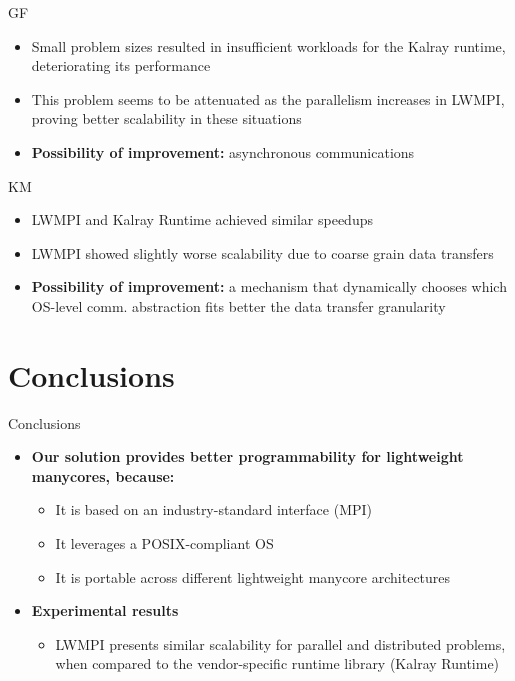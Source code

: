 \documentclass[english,aspectratio=169]{lapesd-slides}
\begin{document}
      \begin{frame}{GF}

        \begin{itemize}
          \item Small problem sizes resulted in insufficient workloads for the Kalray runtime,
          deteriorating its performance
          \item This problem seems to be attenuated as the parallelism increases in LWMPI,
          proving better scalability in these situations
          \item \textbf{Possibility of improvement:} asynchronous communications
        \end{itemize}
      \end{frame}

      \begin{frame}{KM}

        \begin{itemize}
          \item LWMPI and Kalray Runtime achieved similar speedups
          \item LWMPI showed slightly worse scalability due to coarse grain data transfers
          \item \textbf{Possibility of improvement:} a mechanism that dynamically chooses
            which OS-level comm. abstraction fits better the data transfer granularity
        \end{itemize}
      \end{frame}


  \section{Conclusions}
    \begin{frame}{Conclusions}
      \begin{itemize}
      	\item \textbf{Our solution provides better programmability for lightweight manycores, because:}
        \begin{itemize}
           \item It is based on an industry-standard interface (MPI)
           \item It leverages a POSIX-compliant OS
           \item It is portable across different lightweight manycore architectures
       \end{itemize}
	
	\vspace{0.5cm}

        \item \textbf{Experimental results}
        \begin{itemize}
	   \item LWMPI presents similar scalability for parallel and distributed problems, when compared
	   to the vendor-specific runtime library (Kalray Runtime)
       \end{itemize}
      \end{itemize}
    \end{frame}
\end{document}
